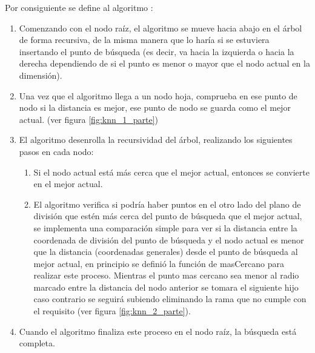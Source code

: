 \documentclass{article}
\begin{document}
    		
    		
    	    Por consiguiente se define al algoritmo \cite{Morgan2006}:
    	    \begin{enumerate}
    	        \item Comenzando con el nodo raíz, el algoritmo se mueve hacia abajo en el árbol de forma recursiva, de la misma manera que lo haría si se estuviera insertando el punto de búsqueda (es decir, va hacia la izquierda o hacia la derecha dependiendo de si el punto es menor o mayor que el nodo actual en la dimensión).
    	        \item Una vez que el algoritmo llega a un nodo hoja, comprueba en ese punto de nodo si la distancia es mejor, ese punto de nodo se guarda como el mejor actual. (ver figura \ref{fig:knn_1_parte})
    	        \item El algoritmo desenrolla la recursividad del árbol, realizando los siguientes pasos en cada nodo:
    	            \begin{enumerate}
    	                \item Si el nodo actual está más cerca que el mejor actual, entonces se convierte en el mejor actual.
    	                \item El algoritmo verifica si podría haber puntos en el otro lado del plano de división que estén más cerca del punto de búsqueda que el mejor actual, se implementa una comparación simple para ver si la distancia entre la coordenada de división del punto de búsqueda y el nodo actual es menor que la distancia (coordenadas generales) desde el punto de búsqueda al mejor actual, en principio se definió la función de masCercano para realizar este proceso. Mientras el punto mas cercano sea menor al radio marcado entre la distancia del nodo anterior se tomara el siguiente hijo caso contrario se seguirá subiendo eliminando la rama que no cumple con el requisito (ver figura \ref{fig:knn_2_parte}).
    	            \end{enumerate}
    	        \item Cuando el algoritmo finaliza este proceso en el nodo raíz, la búsqueda está completa.
    	    \end{enumerate}
    	    
\end{document}
